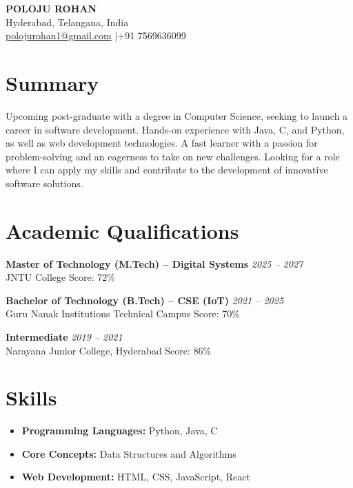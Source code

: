 \documentclass[11pt,a4paper]{article}
\newcommand{\entry}[4]{%
  \textbf{#1} \hfill \textit{#2}\\
  #3 \hfill #4\par\vspace{4pt}}
\begin{document}
\begin{center}
  {\Huge\bfseries\color{accent} POLOJU ROHAN}\\[6pt]
  Hyderabad, Telangana, India\\[2pt]
  \href{mailto:polojurohan1@gmail.com}{polojurohan1@gmail.com}
  \quad$|$\quad +91 7569636099
\end{center}

\section{Summary}
Upcoming post-graduate with a degree in Computer Science, seeking to launch a
career in software development. Hands-on experience with Java, C, and Python,
as well as web development technologies. A fast learner with a passion for
problem-solving and an eagerness to take on new challenges. Looking for a role
where I can apply my skills and contribute to the development of innovative
software solutions.

\section{Academic Qualifications}
\entry{Master of Technology (M.Tech) -- Digital Systems}{2025 -- 2027}
      {JNTU College}{Score: 72\%}

\entry{Bachelor of Technology (B.Tech) -- CSE (IoT)}{2021 -- 2025}
      {Guru Nanak Institutions Technical Campus}{Score: 70\%}

\entry{Intermediate}{2019 -- 2021}
      {Narayana Junior College, Hyderabad}{Score: 86\%}

\section{Skills}
\begin{itemize}
  \item \textbf{Programming Languages:} Python, Java, C
  \item \textbf{Core Concepts:} Data Structures and Algorithms
  \item \textbf{Web Development:} HTML, CSS, JavaScript, React
\end{itemize}

\end{document}
